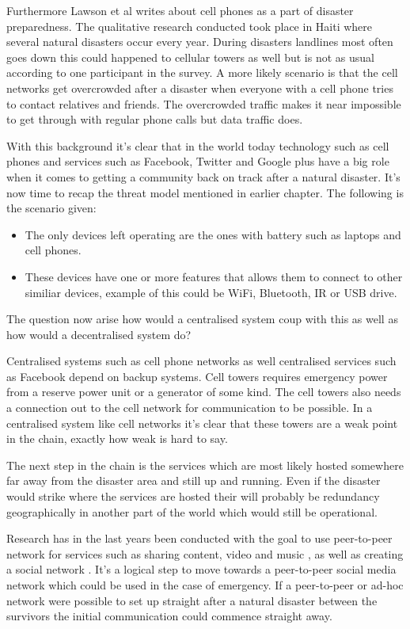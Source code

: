 Furthermore Lawson et al \cite{lawson2012} writes about cell phones as a part of disaster preparedness.
The qualitative research conducted took place in Haiti where several natural disasters occur every year.
During disasters landlines most often goes down this could happened to cellular towers as well but is not as usual according to one participant in the survey.
A more likely scenario is that the cell networks get overcrowded after a disaster when everyone with a cell phone tries to contact relatives and friends.
The overcrowded traffic makes it near impossible to get through with regular phone calls but data traffic does.

With this background it's clear that in the world today technology such as cell phones and services such as Facebook, Twitter and Google plus have a big role when it comes to getting a community back on track after a natural disaster.
It's now time to recap the threat model mentioned in earlier chapter.
The following is the scenario given:
\begin{itemize}
  \item The only devices left operating are the ones with battery such as laptops and cell phones.
  \item These devices have one or more features that allows them to connect to other similiar devices, example of this could be WiFi, Bluetooth, IR or USB drive.
\end{itemize}
The question now arise how would a centralised system coup with this as well as how would a decentralised system do?

Centralised systems such as cell phone networks as well centralised services such as Facebook depend on backup systems.
Cell towers requires emergency power from a reserve power unit or a generator of some kind.
The cell towers also needs a connection out to the cell network for communication to be possible.
In a centralised system like cell networks it's clear that these towers are a weak point in the chain, exactly how weak is hard to say.

The next step in the chain is the services which are most likely hosted somewhere far away from the disaster area and still up and running.
Even if the disaster would strike where the services are hosted their will probably be redundancy geographically in another part of the world which would still be operational.

Research has in the last years been conducted with the goal to use peer-to-peer network for services such as sharing content, video and music \cite{web:tribler}, as well as creating a social network \cite{web:peerson}.
It's a logical step to move towards a peer-to-peer social media network which could be used in the case of emergency.
If a peer-to-peer or ad-hoc network were possible to set up straight after a natural disaster between the survivors the initial communication could commence straight away.

